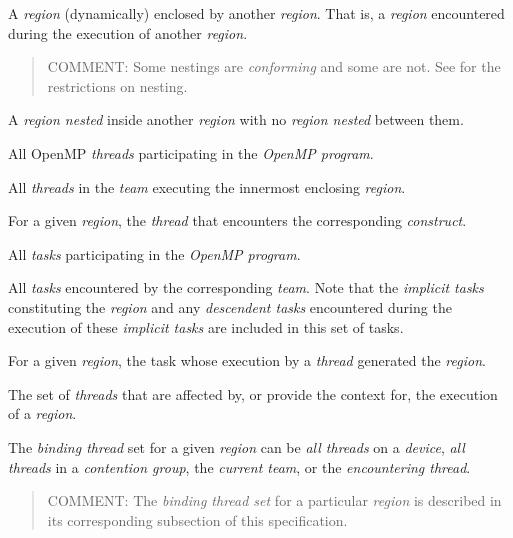 \glossarydefstart
A \emph{region} (dynamically) enclosed by another \emph{region}. That is, a \emph{region} encountered 
during the execution of another \emph{region}.

\begin{quote}
COMMENT: Some nestings are \emph{conforming} and some are not. 
See  for the restrictions on nesting.
\end{quote}
\glossarydefend

\glossarydefstart
A \emph{region nested} inside another \emph{region} with no  \emph{region nested} between 
them. 
\glossarydefend

\glossarydefstart
All OpenMP \emph{threads} participating in the \emph{OpenMP program}.
\glossarydefend

\glossarydefstart
All \emph{threads} in the \emph{team} executing the innermost enclosing  \emph{region}.
\glossarydefend

\glossarydefstart
For a given \emph{region}, the \emph{thread} that encounters the 
corresponding \emph{construct}.
\glossarydefend

\glossarydefstart
All \emph{tasks} participating in the \emph{OpenMP program}. 
\glossarydefend

\glossarydefstart
All \emph{tasks} encountered by the corresponding \emph{team}. Note that the \emph{implicit tasks}
constituting the  \emph{region} and any \emph{descendent tasks} encountered during 
the execution of these \emph{implicit tasks} are included in this set of tasks. 
\glossarydefend

\glossarydefstart
For a given \emph{region}, the task whose execution by a \emph{thread} generated the \emph{region}.
\glossarydefend

\glossarydefstart
The set of \emph{threads} that are affected by, or provide the context for, the execution of 
a \emph{region}. 

The \emph{binding thread} set for a given \emph{region} can be \emph{all threads} on a \emph{device}, \emph{all 
threads} in a \emph{contention group}, the \emph{current team}, or the \emph{encountering thread}.

\begin{quote}
COMMENT: The \emph{binding thread set} for a particular \emph{region} is described in its 
corresponding subsection of this specification.
\end{quote}
\glossarydefend

